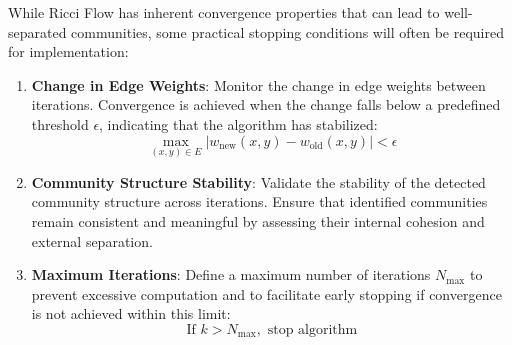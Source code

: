 While Ricci Flow has inherent convergence properties that can lead to well-separated communities, some practical stopping conditions will often be required for implementation:

\begin{enumerate}
    \item \textbf{Change in Edge Weights}: 
    Monitor the change in edge weights between iterations. Convergence is achieved when the change falls below a predefined threshold $\epsilon$, indicating that the algorithm has stabilized:
    \[
    \max_{(x, y) \in E} |w_{\text{new}}(x, y) - w_{\text{old}}(x, y)| < \epsilon
    \]
    
    \item \textbf{Community Structure Stability}: 
    Validate the stability of the detected community structure across iterations. Ensure that identified communities remain consistent and meaningful by assessing their internal cohesion and external separation.
    
    \item \textbf{Maximum Iterations}: 
    Define a maximum number of iterations $N_{\text{max}}$ to prevent excessive computation and to facilitate early stopping if convergence is not achieved within this limit:
    \[
    \text{If } k > N_{\text{max}}, \text{ stop algorithm}
    \]
\end{enumerate}
